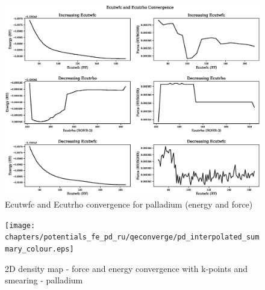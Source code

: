 \begin{landscape}
\FloatBarrier
\begin{figure}
    \begin{center}
        \includegraphics[scale=0.70]{chapters/potentials_fe_pd_ru/qeconverge/pd_ecut_convergence_ry.eps}
        \caption{Ecutwfc and Ecutrho convergence for palladium (energy and force)}
      \label{image:palladiumecut}
    \end{center}
\end{figure}
\FloatBarrier
\end{landscape}

\clearpage

\begin{landscape}
\FloatBarrier
\begin{figure}
    \begin{center}
        \texttt{[image: chapters/potentials\_fe\_pd\_ru/qeconverge/pd\_interpolated\_summary\_colour.eps]}
        \caption{2D density map - force and energy convergence with k-points and smearing - palladium}
      \label{image:palladiumkpointsmearing}
    \end{center}
\end{figure}
\FloatBarrier
\end{landscape}
\clearpage


